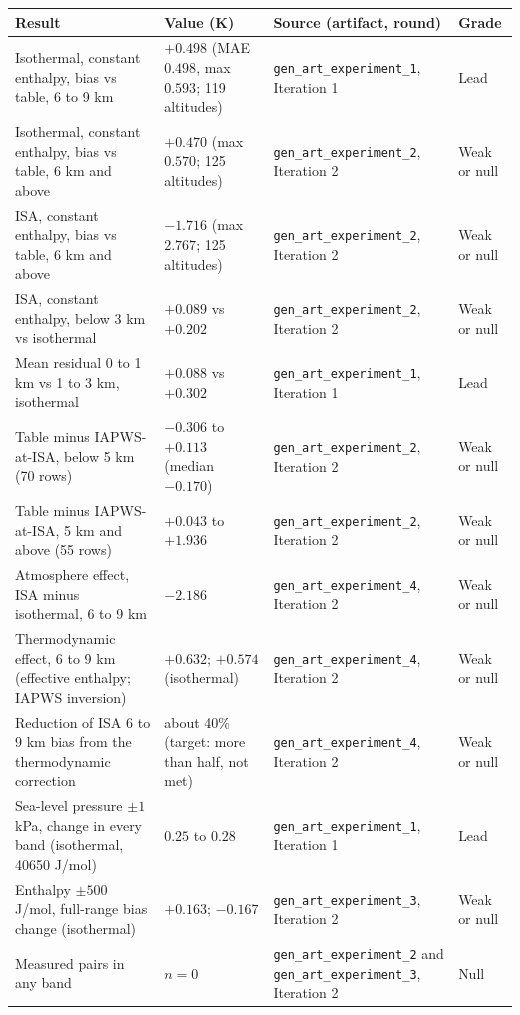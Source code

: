 \documentclass[11pt,letterpaper]{article}
\begin{document}
{\small\begin{longtable}{>{\raggedright\arraybackslash}p{4.6cm}>{\raggedright\arraybackslash}p{4.1cm}>{\raggedright\arraybackslash}p{4.0cm}>{\raggedright\arraybackslash}p{2.3cm}}
\toprule
Result & Value (K) & Source (artifact, round) & Grade \\
\midrule
\endhead
Isothermal, constant enthalpy, bias vs table, 6 to 9 km & $+0.498$ (MAE $0.498$, max $0.593$; 119 altitudes) & \texttt{gen\_art\_experiment\_1}, Iteration 1 & Lead \\
Isothermal, constant enthalpy, bias vs table, 6 km and above & $+0.470$ (max $0.570$; 125 altitudes) & \texttt{gen\_art\_experiment\_2}, Iteration 2 & Weak or null \\
ISA, constant enthalpy, bias vs table, 6 km and above & $-1.716$ (max $2.767$; 125 altitudes) & \texttt{gen\_art\_experiment\_2}, Iteration 2 & Weak or null \\
ISA, constant enthalpy, below 3 km vs isothermal & $+0.089$ vs $+0.202$ & \texttt{gen\_art\_experiment\_2}, Iteration 2 & Weak or null \\
Mean residual 0 to 1 km vs 1 to 3 km, isothermal & $+0.088$ vs $+0.302$ & \texttt{gen\_art\_experiment\_1}, Iteration 1 & Lead \\
Table minus IAPWS-at-ISA, below 5 km (70 rows) & $-0.306$ to $+0.113$ (median $-0.170$) & \texttt{gen\_art\_experiment\_2}, Iteration 2 & Weak or null \\
Table minus IAPWS-at-ISA, 5 km and above (55 rows) & $+0.043$ to $+1.936$ & \texttt{gen\_art\_experiment\_2}, Iteration 2 & Weak or null \\
Atmosphere effect, ISA minus isothermal, 6 to 9 km & $-2.186$ & \texttt{gen\_art\_experiment\_4}, Iteration 2 & Weak or null \\
Thermodynamic effect, 6 to 9 km (effective enthalpy; IAPWS inversion) & $+0.632$; $+0.574$ (isothermal) & \texttt{gen\_art\_experiment\_4}, Iteration 2 & Weak or null \\
Reduction of ISA 6 to 9 km bias from the thermodynamic correction & about 40\% (target: more than half, not met) & \texttt{gen\_art\_experiment\_4}, Iteration 2 & Weak or null \\
Sea-level pressure $\pm 1$ kPa, change in every band (isothermal, 40650 J/mol) & $0.25$ to $0.28$ & \texttt{gen\_art\_experiment\_1}, Iteration 1 & Lead \\
Enthalpy $\pm 500$ J/mol, full-range bias change (isothermal) & $+0.163$; $-0.167$ & \texttt{gen\_art\_experiment\_3}, Iteration 2 & Weak or null \\
Measured pairs in any band & $n = 0$ & \texttt{gen\_art\_experiment\_2} and \texttt{gen\_art\_experiment\_3}, Iteration 2 & Null \\
\bottomrule
\end{longtable}}
\end{document}
